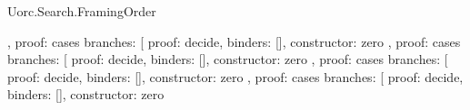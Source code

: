 \begin{lexlean}{Uorc.Search.FramingOrder}
\begin{semanticmodule}
{{{{{{{{{{{{{{{{{{{{{                                                            },
                                                            {
                                                              proof: cases{
                                                                branches: [
                                                                  {
                                                                    proof: decide{},
                                                                    binders: [],
                                                                    constructor: zero
                                                                  },
                                                                  {
                                                                    proof: cases{
                                                                      branches: [
                                                                        {
                                                                          proof: decide{},
                                                                          binders: [],
                                                                          constructor: zero
                                                                        },
                                                                        {
                                                                          proof: cases{
                                                                            branches: [
                                                                              {
                                                                                proof: decide{},
                                                                                binders: [],
                                                                                constructor: zero
                                                                              },
                                                                              {
                                                                                proof: cases{
                                                                                  branches: [
                                                                                    {
                                                                                      proof: decide{},
                                                                                      binders: [],
                                                                                      constructor: zero
}}}}}}}}}}}}}}}}}}}}}}}}}}}}}
\end{semanticmodule}
\end{lexlean}
